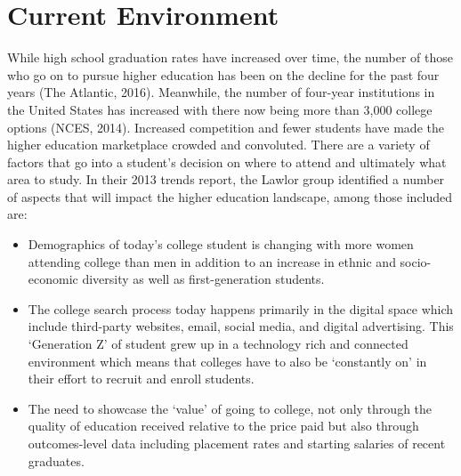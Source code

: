 \documentclass[sigconf]{acmart}
\begin{document}
\section{Current Environment}

While high school graduation rates have increased over time, the number of those who go on to pursue higher education has been on the decline for the past four years (The Atlantic, 2016). Meanwhile, the number of four-year institutions in the United States has increased with there now being more than 3,000 college options (NCES, 2014). Increased competition and fewer students have made the higher education marketplace crowded and convoluted. There are a variety of factors that go into a student’s decision on where to attend and ultimately what area to study. In their 2013 trends report, the Lawlor group identified a number of aspects that will impact the higher education landscape, among those included are:

\begin{itemize}
\item Demographics of today’s college student is changing with more women attending college than men in addition to an increase in ethnic and socio-economic diversity as well as first-generation students. 

\item The college search process today happens primarily in the digital space which include third-party websites, email, social media, and digital advertising. This ‘Generation Z’ of student grew up in a technology rich and connected environment which means that colleges have to also be ‘constantly on’ in their effort to recruit and enroll students.

\item The need to showcase the ‘value’ of going to college, not only through the quality of education received relative to the price paid but also through outcomes-level data including placement rates and starting salaries of recent graduates. 
\end{itemize}
\end{document}
